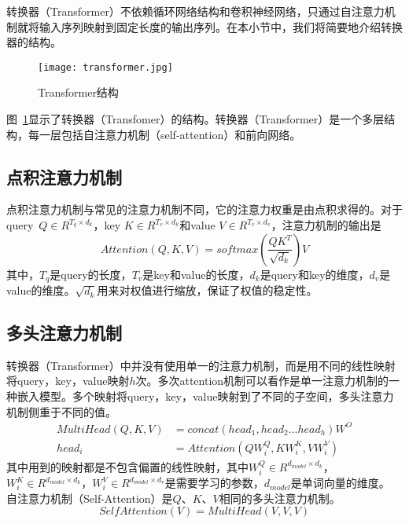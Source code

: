 转换器（Transformer）\cite{NIPS2017_7181}不依赖循环网络结构和卷积神经网络，只通过自注意力机制就将输入序列映射到固定长度的输出序列。在本小节中，我们将简要地介绍转换器的结构。

\begin{figure}[ht]
    \centering 
    \texttt{[image: transformer.jpg]}
    \caption{Transformer结构}
    \label{fig:transformer}
\end{figure}

图~\ref{fig:transformer}显示了转换器（Transfomer）的结构。转换器（Transformer）是一个多层结构，每一层包括自注意力机制（self-attention）和前向网络。

\subsection{点积注意力机制}

点积注意力机制与常见的注意力机制不同，它的注意力权重是由点积求得的。对于query~$Q\in R^{T_q\times d_k}$，key $K\in R^{T_v\times d_k}$和value $V\in R^{T_v\times d_v}$，注意力机制的输出是
\begin{equation}
    Attention(Q,K,V)=softmax(\frac{QK^T}{\sqrt{d_k}})V
\end{equation}
其中，$T_q$是query的长度，$T_v$是key和value的长度，$d_k$是query和key的维度，$d_v$是value的维度。$\sqrt{d_k}$用来对权值进行缩放，保证了权值的稳定性。
\subsection{多头注意力机制}
转换器（Transformer）中并没有使用单一的注意力机制，而是用不同的线性映射将query，key，value映射$h$次。多次attention机制可以看作是单一注意力机制的一种嵌入模型。多个映射将query，key，value映射到了不同的子空间，多头注意力机制侧重于不同的值。
\begin{equation}
    \begin{aligned}
        MultiHead(Q,K,V)&=concat(head_1,head_2...head_h)W^O\\
        head_i&=Attention(QW^Q_i,KW^K_i,VW^V_i)
    \end{aligned}
\end{equation}
其中用到的映射都是不包含偏置的线性映射，其中$W^Q_i\in R^{d_{model}\times d_k}$，$W^K_i\in R^{d_{model}\times d_k}$，$W^V_i\in R^{d_{model}\times d_v}$是需要学习的参数，$d_{model}$是单词向量的维度。
自注意力机制（Self-Attention）是$Q$、$K$、$V$相同的多头注意力机制。
\begin{equation}
    SelfAttention(V)=MultiHead(V,V,V)
\end{equation}
